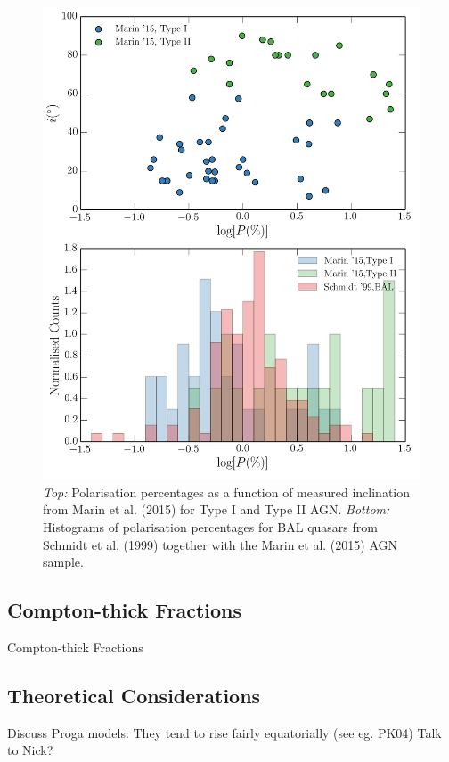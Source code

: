 \begin{figure}
\centering
\includegraphics[width=1.0\textwidth]{figures/ewpaper/hist_p.png}
\caption
{
{\sl Top:} 
Polarisation percentages as a function of measured inclination from
Marin et al. (2015) for Type I and Type II AGN.
{\sl Bottom:} Histograms of polarisation percentages 
for BAL quasars from Schmidt et al. (1999) together with the 
Marin et al. (2015) AGN sample. 
}
\label{fig:lobal}
\end{figure}


\subsection{Compton-thick Fractions}

Compton-thick Fractions

\subsection{Theoretical Considerations}

Discuss Proga models: They tend to rise fairly equatorially (see eg. PK04) Talk to Nick?


